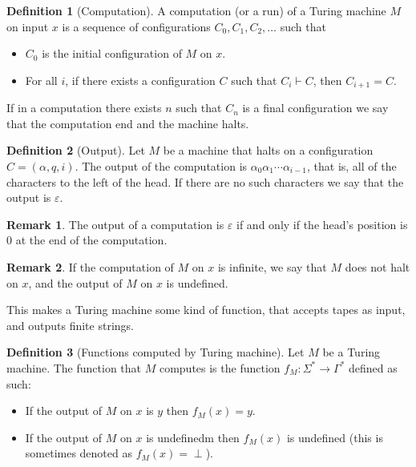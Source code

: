 \documentclass[11pt,a4paper]{article}
\theoremstyle{definition}
\newtheorem{definition}{Definition}[section]
\newtheorem{remark}{Remark}[section]
\theoremstyle{plain}
\begin{document}
  \begin{definition}[Computation]
    A computation (or a run) of a Turing machine $M$ on input $x$ is a
    sequence of configurations $C_0,C_1,C_2,\dots$ such that
    \begin{itemize}
      \item $C_0$ is the initial configuration of $M$ on $x$.
      \item For all $i$, if there exists a configuration $C$ such that
        $C_i \vdash C$, then $C_{i+1} = C$.
    \end{itemize}
  \end{definition}
  
  If in a computation there exists $n$ such that $C_n$ is a final 
  configuration we say that the computation end and the machine halts.

  \begin{definition}[Output]
    Let $M$ be a machine that halts on a configuration $C = (\alpha,q,i)$.
    The output of the computation is $\alpha_0 \alpha_1 \cdots \alpha_{i-1}$,
    that is, all of the characters to the left of the head.
    If there are no such characters we say that the output is $\varepsilon$.
  \end{definition}
  \begin{remark}
    The output of a computation is $\varepsilon$ if and only if the head's
    position is $0$ at the end of the computation.
  \end{remark}
  \begin{remark}
    If the computation of $M$ on $x$ is infinite, we say that $M$ does not
    halt on $x$, and the output of $M$ on $x$ is undefined.
  \end{remark}

  This makes a Turing machine some kind of function, that accepts tapes
  as input, and outputs finite strings.

  \begin{definition}[Functions computed by Turing machine]
    Let $M$ be a Turing machine.
    The function that $M$ computes is the function
    $f_M \colon \Sigma^* \to \Gamma^*$ defined as such:
    \begin{itemize}
      \item If the output of $M$ on $x$ is $y$ then $f_M(x) = y$.
      \item If the output of $M$ on $x$ is undefinedm then $f_M(x)$
        is undefined (this is sometimes denoted as $f_M(x) = \perp$).
    \end{itemize}
  \end{definition}
\end{document}
